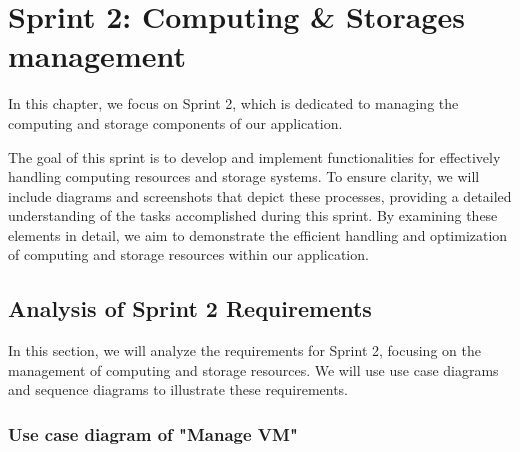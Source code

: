 \chapter{Sprint 2: Computing \& Storages management}
In this chapter, we focus on Sprint 2, which is dedicated to managing the computing and storage components of our application. 

The goal of this sprint is to develop and implement functionalities for effectively handling computing resources and storage systems. To ensure clarity, we will include diagrams and screenshots that depict these processes, providing a detailed understanding of the tasks accomplished during this sprint. By examining these elements in detail, we aim to demonstrate the efficient handling and optimization of computing and storage resources within our application.
\section{Analysis of Sprint 2 Requirements}
In this section, we will analyze the requirements for Sprint 2, focusing on the management of computing and storage resources. We will use use case diagrams and sequence diagrams to illustrate these requirements.


\subsection{Use case diagram of "Manage VM"}

